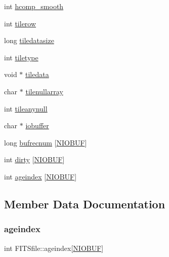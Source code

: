 \begin{DoxyCompactItemize}
\item 
int \hyperlink{struct_f_i_t_sfile_ab53ce2a1c3ff114d5faef7c0bdf40e44}{hcomp\+\_\+smooth}
\item 
int \hyperlink{struct_f_i_t_sfile_ac9c143f399526288e10a6a6af6e8bbe6}{tilerow}
\item 
long \hyperlink{struct_f_i_t_sfile_a7b0d02f899ecebac5f303a432cebb761}{tiledatasize}
\item 
int \hyperlink{struct_f_i_t_sfile_a48f0d8dc61a66032feb5634ac2eae27c}{tiletype}
\item 
void $\ast$ \hyperlink{struct_f_i_t_sfile_aed6743bf12fa9636d998a113c8c55e8f}{tiledata}
\item 
char $\ast$ \hyperlink{struct_f_i_t_sfile_a98971a32160de72b277f1e6a5d7eda84}{tilenullarray}
\item 
int \hyperlink{struct_f_i_t_sfile_a17244268f9019faeb8558b5ce2d7232d}{tileanynull}
\item 
char $\ast$ \hyperlink{struct_f_i_t_sfile_a14b124d8d42ce7a1142a2c51e713ae87}{iobuffer}
\item 
long \hyperlink{struct_f_i_t_sfile_a11a4f089b13a2094847af06f6971367b}{bufrecnum} \mbox{[}\hyperlink{fitsio_8h_ac18b5e5e6009d53115044eb5f5dc7328}{N\+I\+O\+B\+UF}\mbox{]}
\item 
int \hyperlink{struct_f_i_t_sfile_a829a09a6082d811dd549d3a6b115fb60}{dirty} \mbox{[}\hyperlink{fitsio_8h_ac18b5e5e6009d53115044eb5f5dc7328}{N\+I\+O\+B\+UF}\mbox{]}
\item 
int \hyperlink{struct_f_i_t_sfile_a58073e170977e55bab8e3a7af4cd8c84}{ageindex} \mbox{[}\hyperlink{fitsio_8h_ac18b5e5e6009d53115044eb5f5dc7328}{N\+I\+O\+B\+UF}\mbox{]}
\end{DoxyCompactItemize}


\subsection{Member Data Documentation}
\mbox{\label{struct_f_i_t_sfile_a58073e170977e55bab8e3a7af4cd8c84}} 
\subsubsection{\texorpdfstring{ageindex}{ageindex}}
{\footnotesize\ttfamily int F\+I\+T\+Sfile\+::ageindex\mbox{[}\hyperlink{fitsio_8h_ac18b5e5e6009d53115044eb5f5dc7328}{N\+I\+O\+B\+UF}\mbox{]}}

